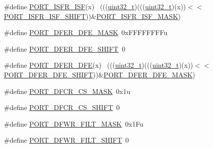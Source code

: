 \begin{DoxyCompactItemize}
\item 
\#define \hyperlink{group___p_o_r_t___register___masks_ga0cef94247261ca16ebf25b6f432f1344}{P\+O\+R\+T\+\_\+\+I\+S\+F\+R\+\_\+\+I\+SF}(x)                                              ~(((\hyperlink{_p_e___types_8h_a33594304e786b158f3fb30289278f5af}{uint32\+\_\+t})(((\hyperlink{_p_e___types_8h_a33594304e786b158f3fb30289278f5af}{uint32\+\_\+t})(x))$<$$<$\hyperlink{group___p_o_r_t___register___masks_ga678f290447622562272513d57eb2bf78}{P\+O\+R\+T\+\_\+\+I\+S\+F\+R\+\_\+\+I\+S\+F\+\_\+\+S\+H\+I\+FT}))\&\hyperlink{group___p_o_r_t___register___masks_gabb5d188f3dfe38f0d8bbb870e81fb7e3}{P\+O\+R\+T\+\_\+\+I\+S\+F\+R\+\_\+\+I\+S\+F\+\_\+\+M\+A\+SK})
\item 
\#define \hyperlink{group___p_o_r_t___register___masks_ga450c760a693b115dc630c8a5edb628df}{P\+O\+R\+T\+\_\+\+D\+F\+E\+R\+\_\+\+D\+F\+E\+\_\+\+M\+A\+SK}~0x\+F\+F\+F\+F\+F\+F\+F\+Fu
\item 
\#define \hyperlink{group___p_o_r_t___register___masks_ga7bcd0509509d5a2865efab49eef02c56}{P\+O\+R\+T\+\_\+\+D\+F\+E\+R\+\_\+\+D\+F\+E\+\_\+\+S\+H\+I\+FT}~0
\item 
\#define \hyperlink{group___p_o_r_t___register___masks_gacfcb713492555bf46eb37c6739ef836e}{P\+O\+R\+T\+\_\+\+D\+F\+E\+R\+\_\+\+D\+FE}(x)                                              ~(((\hyperlink{_p_e___types_8h_a33594304e786b158f3fb30289278f5af}{uint32\+\_\+t})(((\hyperlink{_p_e___types_8h_a33594304e786b158f3fb30289278f5af}{uint32\+\_\+t})(x))$<$$<$\hyperlink{group___p_o_r_t___register___masks_ga7bcd0509509d5a2865efab49eef02c56}{P\+O\+R\+T\+\_\+\+D\+F\+E\+R\+\_\+\+D\+F\+E\+\_\+\+S\+H\+I\+FT}))\&\hyperlink{group___p_o_r_t___register___masks_ga450c760a693b115dc630c8a5edb628df}{P\+O\+R\+T\+\_\+\+D\+F\+E\+R\+\_\+\+D\+F\+E\+\_\+\+M\+A\+SK})
\item 
\#define \hyperlink{group___p_o_r_t___register___masks_gadc66969dfb648b725cd30df406f7a2f9}{P\+O\+R\+T\+\_\+\+D\+F\+C\+R\+\_\+\+C\+S\+\_\+\+M\+A\+SK}~0x1u
\item 
\#define \hyperlink{group___p_o_r_t___register___masks_gac739bd97cc0b19198e8daa335c984500}{P\+O\+R\+T\+\_\+\+D\+F\+C\+R\+\_\+\+C\+S\+\_\+\+S\+H\+I\+FT}~0
\item 
\#define \hyperlink{group___p_o_r_t___register___masks_gaf2f0bbe1dea504156dce840fdcb94b74}{P\+O\+R\+T\+\_\+\+D\+F\+W\+R\+\_\+\+F\+I\+L\+T\+\_\+\+M\+A\+SK}~0x1\+Fu
\item 
\#define \hyperlink{group___p_o_r_t___register___masks_ga9045bd83bc548178d057bf4916c8fe08}{P\+O\+R\+T\+\_\+\+D\+F\+W\+R\+\_\+\+F\+I\+L\+T\+\_\+\+S\+H\+I\+FT}~0

\end{DoxyCompactItemize}
